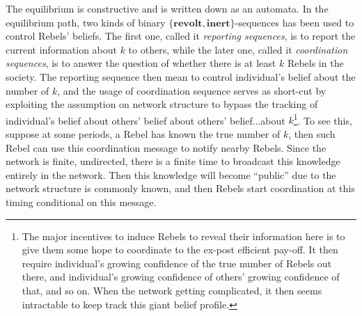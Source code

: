 \documentclass[12pt,letter]{article}
\theoremstyle{remark}
\theoremstyle{remark}
\theoremstyle{claim}
\begin{document}
The equilibrium is constructive and is written down as an automata. In the equilibrium path, two kinds of binary $\{\textbf{revolt},\textbf{inert}\}$-sequences has been used to control Rebels' beliefs. The first one, called it \textit{reporting sequences}, is to report the current information about $k$ to others, while the later one, called it \textit{coordination sequences}, is to answer the question of whether there is at least $k$ Rebels in the society. The reporting sequence then mean to control individual's belief about the number of $k$, and the usage of coordination sequence serves as short-cut by exploiting the assumption on network structure to bypass the tracking of individual's belief about others' belief about others' belief...about $k$\footnote{The major incentives to induce Rebels to reveal their information here is to give them some hope to coordinate to the ex-post efficient pay-off. It then require individual's growing confidence of the true number of Rebels out there, and individual's growing confidence of others' growing confidence of that, and so on. When the network getting complicated, it then seems intractable to keep track this giant belief profile.}. To see this, suppose at some periods, a Rebel has known the true number of $k$, then such Rebel can use this coordination message to notify nearby Rebels. Since the network is finite, undirected, there is a finite time to broadcast this knowledge entirely in the network. Then this knowledge will become ``public'' due to the network structure is commonly known, and then Rebels start coordination at this timing conditional on this message.
\end{document}
